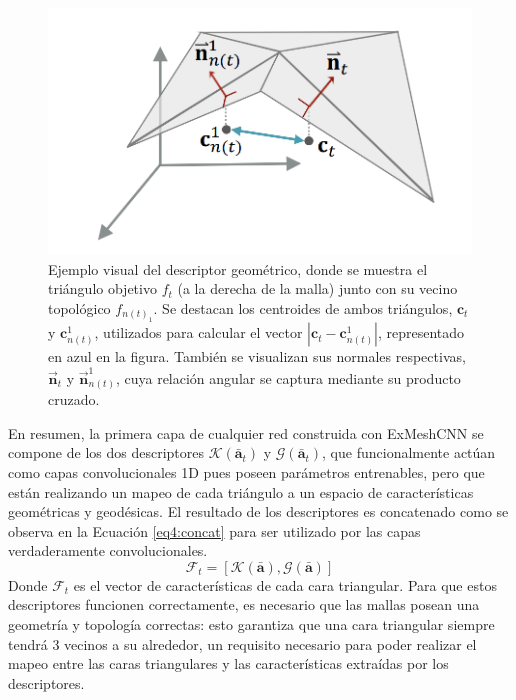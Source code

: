 \begin{figure}[htb]
    \centering
    \includegraphics[width=0.75\linewidth]{figures/4_materials-methods/geometric_decriptor.png}
    \caption[Ejemplo visual del descriptor geométrico]{Ejemplo visual del descriptor geométrico, donde se muestra el triángulo objetivo $f_t$ (a la derecha de la malla) junto con su vecino topológico $f_{n(t)_1}$. Se destacan los centroides de ambos triángulos, $\textbf{c}_{t}$ y $ \textbf{c}_{n(t)}^{1}$, utilizados para calcular el vector $\left| \textbf{c}_{t} - \textbf{c}_{n(t)}^{1} \right|$, representado en azul en la figura. También se visualizan sus normales respectivas, $\overrightarrow{\textbf{n}}_{t}$ y $\overrightarrow{\textbf{n}}_{n(t)}^{1}$, cuya relación angular se captura mediante su producto cruzado.}
    \label{geom_descrp}
\end{figure}


En resumen, la primera capa de cualquier red construida con ExMeshCNN se compone de los dos descriptores $\mathcal{K}(\bar{\textbf{a}}_t)$ y $\mathcal{G}(\bar{\textbf{a}}_t)$, que funcionalmente actúan como capas convolucionales 1D pues poseen parámetros entrenables, pero que están realizando un mapeo de cada triángulo a un espacio de características geométricas y geodésicas. El resultado de los descriptores es concatenado como se observa en la Ecuación \ref{eq4:concat} para ser utilizado por las capas verdaderamente convolucionales.
\begin{equation}
    \label{eq4:concat}
    \mathcal{F}_{t} = \left[\mathcal{K}(\bar{\textbf{a}}), \mathcal{G}(\bar{\textbf{a}}) \right]
\end{equation}
Donde $\mathcal{F}_{t}$ es el vector de características de cada cara triangular. Para que estos descriptores funcionen correctamente, es necesario que las mallas posean una geometría y topología correctas: esto garantiza que una cara triangular siempre tendrá 3 vecinos a su alrededor, un requisito necesario para poder realizar el mapeo entre las caras triangulares y las características extraídas por los descriptores. 

